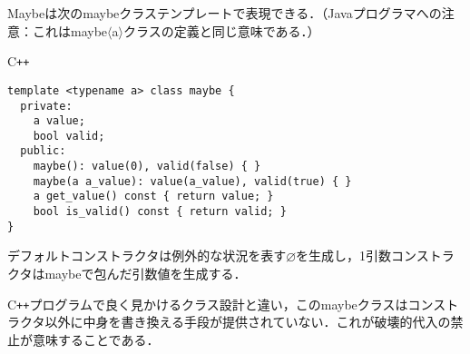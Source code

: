 \documentclass[a5paper,draft]{jsbook}
\newcommand{\programminglanguage}[1]{\textsf{#1}}
\newcommand{\cxx}{\programminglanguage{C}\texttt{++}}
\newenvironment{cxxcode}{\begin{itembox}[r]{\cxx}}{\end{itembox}}
\newcommand{\pthnClassname}[1]{\textrm{#1}}
\newcommand{\pthnId}[1]{\textit{#1}}
\newcommand{\pthnKeyword}[1]{\textbf{#1}}
\newcommand{\hsklNothing}{\varnothing}
\begin{document}
Maybeは次の\pthnClassname{maybe}クラステンプレートで表現できる．（Javaプログラマへの注意：これは\pthnClassname{maybe}$\langle$\pthnClassname{a}$\rangle$クラスの定義と同じ意味である．）
\begin{cxxcode}
\begin{verbatim}
template <typename a> class maybe {
  private:
    a value;
    bool valid;
  public:
    maybe(): value(0), valid(false) { }
    maybe(a a_value): value(a_value), valid(true) { }
    a get_value() const { return value; }
    bool is_valid() const { return valid; }
}
\end{verbatim}
\end{cxxcode}
デフォルトコンストラクタは例外的な状況を表す$\hsklNothing$を生成し，1引数コンストラクタは\pthnClassname{maybe}で包んだ引数値を生成する．

\cxx プログラムで良く見かけるクラス設計と違い，この\pthnClassname{maybe}クラスはコンストラクタ以外に中身を書き換える手段が提供されていない．これが破壊的代入の禁止が意味することである．
\end{document}
